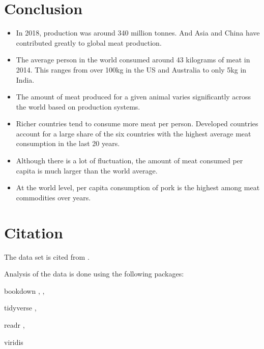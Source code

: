 \documentclass[11pt,a4paper,]{article}
\begin{document}
\clearpage

\hypertarget{conclusion}{%
\section{Conclusion}\label{conclusion}}

\begin{itemize}
\item
  In 2018, production was around 340 million tonnes. And Asia and China have contributed greatly to global meat production.
\item
  The average person in the world consumed around 43 kilograms of meat in 2014. This ranges from over 100kg in the US and Australia to only 5kg in India.
\item
  The amount of meat produced for a given animal varies significantly across the world based on production systems.
\item
  Richer countries tend to consume more meat per person. Developed countries account for a large share of the six countries with the highest average meat consumption in the last 20 years.
\item
  Although there is a lot of fluctuation, the amount of meat consumed per capita is much larger than the world average.
\item
  At the world level, per capita consumption of pork is the highest among meat commodities over years.
\end{itemize}

\section*{Citation}

The data set is cited from \textcite{owidmeatproduction}.

Analysis of the data is done using the following packages:

bookdown \textcite{bookdown1}, \textcite{bookdown2},

tidyverse \textcite{tidyverse},

readr \textcite{readr},

viridis \textcite{viridis}

\printbibliography
\end{document}
